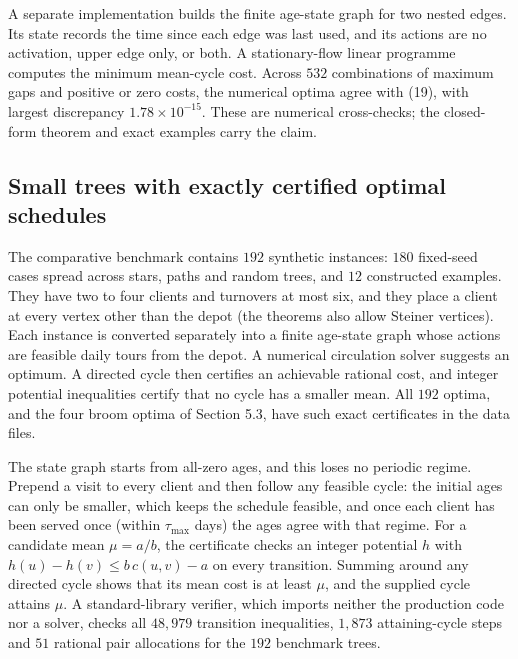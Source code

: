 \documentclass[
  british,
  11pt,
  a4paper,
]{article}
\begin{document}
A separate implementation builds the finite age-state graph for two
nested edges. Its state records the time since each edge was last used,
and its actions are no activation, upper edge only, or both. A
stationary-flow linear programme computes the minimum mean-cycle cost.
Across \(532\) combinations of maximum gaps and positive or zero costs,
the numerical optima agree with (19), with largest discrepancy
\(1.78\times10^{-15}\). These are numerical cross-checks; the
closed-form theorem and exact examples carry the claim.

\subsection{Small trees with exactly certified optimal
schedules}\label{small-trees-with-exactly-certified-optimal-schedules}

The comparative benchmark contains \(192\) synthetic instances: \(180\)
fixed-seed cases spread across stars, paths and random trees, and \(12\)
constructed examples. They have two to four clients and turnovers at
most six, and they place a client at every vertex other than the depot
(the theorems also allow Steiner vertices). Each instance is converted
separately into a finite age-state graph whose actions are feasible
daily tours from the depot. A numerical circulation solver suggests an
optimum. A directed cycle then certifies an achievable rational cost,
and integer potential inequalities certify that no cycle has a smaller
mean. All \(192\) optima, and the four broom optima of Section 5.3, have
such exact certificates in the data files.

The state graph starts from all-zero ages, and this loses no periodic
regime. Prepend a visit to every client and then follow any feasible
cycle: the initial ages can only be smaller, which keeps the schedule
feasible, and once each client has been served once (within
\(\tau_{\max}\) days) the ages agree with that regime. For a candidate
mean \(\mu=a/b\), the certificate checks an integer potential \(h\) with
\(h(u)-h(v)\le b\,c(u,v)-a\) on every transition. Summing around any
directed cycle shows that its mean cost is at least \(\mu\), and the
supplied cycle attains \(\mu\). A standard-library verifier, which
imports neither the production code nor a solver, checks all \(48,979\)
transition inequalities, \(1,873\) attaining-cycle steps and \(51\)
rational pair allocations for the \(192\) benchmark trees.
\end{document}
